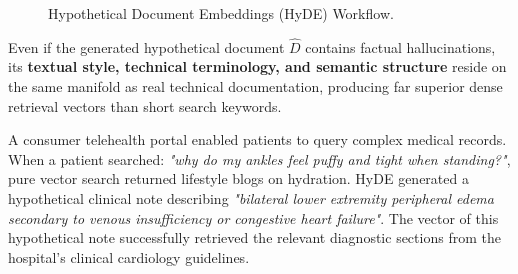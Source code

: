 \begin{figure}[htbp]
\centering
{}
\caption{Hypothetical Document Embeddings (HyDE) Workflow.}
\label{fig:hyde_workflow}
\end{figure}

Even if the generated hypothetical document $\hat{D}$ contains factual hallucinations, its \textbf{textual style, technical terminology, and semantic structure} reside on the same manifold as real technical documentation, producing far superior dense retrieval vectors than short search keywords.

\begin{realworldbox}
A consumer telehealth portal enabled patients to query complex medical records. When a patient searched: \emph{"why do my ankles feel puffy and tight when standing?"}, pure vector search returned lifestyle blogs on hydration.
HyDE generated a hypothetical clinical note describing \emph{"bilateral lower extremity peripheral edema secondary to venous insufficiency or congestive heart failure"}. The vector of this hypothetical note successfully retrieved the relevant diagnostic sections from the hospital's clinical cardiology guidelines.
\end{realworldbox}

